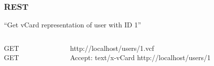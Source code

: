 \begin{frame}
  \frametitle{REST}
  \begin{center}
  ``Get vCard representation of user with ID 1''
  \end{center}
  \begin{columns}
    \begin{column}{.2\textwidth}
      \begin{flushright}
      GET\\
      GET
      \end{flushright}
    \end{column}    
    \begin{column}{.8\textwidth}
      \begin{flushleft}
      http://localhost/users/1\alert{.vcf}\\
      \alert{Accept: text/x-vCard} http://localhost/users/1
      \end{flushleft}
    \end{column}    
  \end{columns}
\end{frame}

